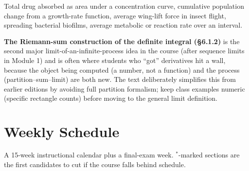 \documentclass[11pt]{article}
\newcommand{\opt}{$^{\ast}$}
\begin{document}
\begin{appbox}
Total drug absorbed as area under a concentration curve, cumulative population change from
a growth-rate function, average wing-lift force in insect flight, spreading bacterial
biofilms, average metabolic or reaction rate over an interval.
\end{appbox}

\begin{diffbox}
\textbf{The Riemann-sum construction of the definite integral (\S6.1.2)} is the second
major limit-of-an-infinite-process idea in the course (after sequence limits in Module 1)
and is often where students who ``got'' derivatives hit a wall, because the object being
computed (a number, not a function) and the process (partition--sum--limit) are both new.
The text deliberately simplifies this from earlier editions by avoiding full partition
formalism; keep class examples numeric (specific rectangle counts) before moving to the
general limit definition.
\end{diffbox}

\newpage
\section{Weekly Schedule}
\label{sec:schedule}

A 15-week instructional calendar plus a final-exam week. \opt-marked sections are the
first candidates to cut if the course falls behind schedule.
\end{document}
